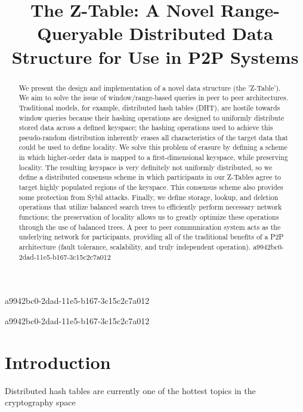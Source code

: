 \documentclass[12pt]{article}
\title{The Z-Table: A Novel Range-Queryable Distributed Data Structure for Use in P2P Systems}
\begin{document}
a9942bc0-2dad-11e5-b167-3c15c2c7a012
\maketitle

\begin{abstract}
We present the design and implementation of a novel data structure (the 'Z-Table'). We aim to solve the issue of window/range-based queries in peer to peer architectures. Traditional models, for example,  distributed hash tables (DHT), are hostile towards window queries because their hashing operations are designed to uniformly distribute stored data across a defined keyspace; the hashing operations used to achieve this pseudo-random distribution inherently erases all characteristics of the target data that could be used to define locality. We solve this problem of erasure by defining a scheme in which higher-order data is mapped to a first-dimensional keyspace, while preserving locality. The resulting keyspace is very definitely not uniformly distributed, so we define a distributed consensus scheme in which participants in our Z-Tables agree to target highly populated regions of the keyspace. This consensus scheme also provides some protection from Sybil attacks. Finally, we define storage, lookup, and deletion operations that utilize balanced search trees to efficiently perform necessary network functions; the preservation of locality allows us to greatly optimize these operations through the use of balanced trees. A peer to peer communication system acts as the underlying network for participants, providing all of the traditional benefits of a P2P architecture (fault tolerance, scalability, and truly independent operation).
a9942bc0-2dad-11e5-b167-3c15c2c7a012\end{abstract}

a9942bc0-2dad-11e5-b167-3c15c2c7a012
\newpage
\section{Introduction}
Distributed hash tables are currently one of the hottest topics in the cryptography space~\cite{Stoica:2001dj,Rowstron:2001ea,Ratnasamy:2001wn}

\printbibliography
\end{document}
